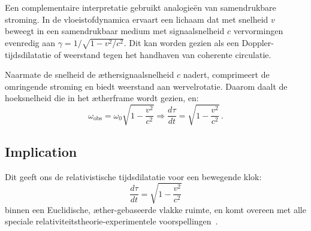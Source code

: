 Een complementaire interpretatie gebruikt analogieën van samendrukbare stroming. In de vloeistofdynamica ervaart een lichaam dat met snelheid $v$ beweegt in een samendrukbaar medium met signaalsnelheid $c$ vervormingen evenredig aan $\gamma = 1/\sqrt{1 - v^2/c^2}$. Dit kan worden gezien als een Doppler-tijdsdilatatie of weerstand tegen het handhaven van coherente circulatie.

Naarmate de snelheid de æthersignaalsnelheid $c$ nadert, comprimeert de omringende stroming en biedt weerstand aan wervelrotatie. Daarom daalt de hoeksnelheid die in het ætherframe wordt gezien, en:
\[
    \omega_{\text{obs}} = \omega_0 \sqrt{1 - \frac{v^2}{c^2}} \Rightarrow \frac{d\tau}{dt} = \sqrt{1 - \frac{v^2}{c^2}} \,. \tag{3}
\]

\subsection*{Implication}

Dit geeft ons de relativistische tijdsdilatatie voor een bewegende klok:
\[
    \boxed{\frac{d\tau}{dt} = \sqrt{1 - \frac{v^2}{c^2}}}
\]
binnen een Euclidische, æther-gebaseerde vlakke ruimte, en komt overeen met alle speciale relativiteitstheorie-experimentele voorspellingen~\cite{Rado2020-aether-Lorentz,Levy2009-aether-clock}.